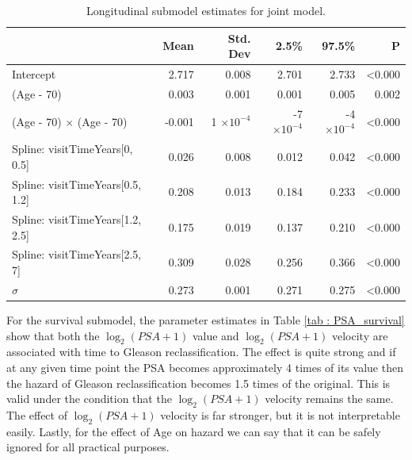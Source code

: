 \begin{table}[!htb]
\centering
\caption{Longitudinal submodel estimates for joint model.}
\label{tab : PSA_long}
\captionsetup{justification=centering}
\begin{tabular}{@{}lrrrrr@{}}
\toprule
                                     & Mean   & Std. Dev           & 2.5\%               & 97.5\%              & P              \\ \midrule
Intercept                            & 2.717  & 0.008              & 2.701               & 2.733               & \textless0.000 \\
(Age - 70)                           & 0.003  & 0.001              & 0.001               & 0.005               & 0.002          \\
(Age - 70) $\times$ (Age - 70)       & -0.001 & 1 $\times 10^{-4}$ & -7 $\times 10^{-4}$ & -4 $\times 10^{-4}$ & \textless0.000 \\
Spline: visitTimeYears{[}0, 0.5{]}   & 0.026  & 0.008              & 0.012               & 0.042               & \textless0.000 \\
Spline: visitTimeYears{[}0.5, 1.2{]} & 0.208  & 0.013              & 0.184               & 0.233               & \textless0.000 \\
Spline: visitTimeYears{[}1.2, 2.5{]} & 0.175  & 0.019              & 0.137               & 0.210               & \textless0.000 \\
Spline: visitTimeYears{[}2.5, 7{]}   & 0.309  & 0.028              & 0.256               & 0.366               & \textless0.000 \\
$\sigma$                               & 0.273  & 0.001              & 0.271               & 0.275               & \textless0.000 \\ \bottomrule
\end{tabular}
\end{table}

For the survival submodel, the parameter estimates in Table \ref{tab : PSA_survival} show that both the $\log_2(PSA + 1)$ value and $\log_2(PSA + 1)$ velocity are associated with time to Gleason reclassification. The effect is quite strong and if at any given time point the PSA becomes approximately 4 times of its value then the hazard of Gleason reclassification  becomes 1.5 times of the original. This is valid under the condition that the $\log_2(PSA + 1)$ velocity remains the same. The effect of $\log_2(PSA + 1)$ velocity is far stronger, but it is not interpretable easily. Lastly, for the effect of Age on hazard we can say that it can be safely ignored for all practical purposes.

